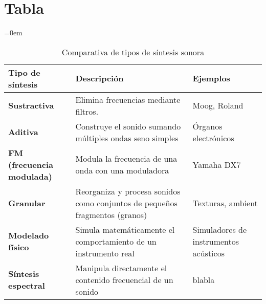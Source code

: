 \section{Tabla}

\parindent=0em
\noindent

\begin{table}[H]
\centering
\begin{tabular}{|l|p{6cm}|p{4cm}|}%
\hline %
\textbf{Tipo de síntesis} & \textbf{Descripción} & \textbf{Ejemplos} \\
\hline
\textbf{Sustractiva} & Elimina frecuencias mediante filtros. & Moog, Roland \\
\hline
\textbf{Aditiva} & Construye el sonido sumando múltiples ondas seno simples & Órganos electrónicos \\
\hline
\textbf{FM (frecuencia modulada)} & Modula la frecuencia de una onda con una moduladora & Yamaha DX7 \\
\hline
\textbf{Granular} & Reorganiza y procesa sonidos como conjuntos de pequeños fragmentos (granos) & Texturas, ambient \\
\hline
\textbf{Modelado físico} & Simula matemáticamente el comportamiento de un instrumento real  & Simuladores de instrumentos acústicos\\
\hline
\textbf{Síntesis espectral} & Manipula directamente el contenido frecuencial de un sonido & blabla \\
\hline
\end{tabular}
\caption{Comparativa de tipos de síntesis sonora}
\label{tab:sintesis}
\end{table}
